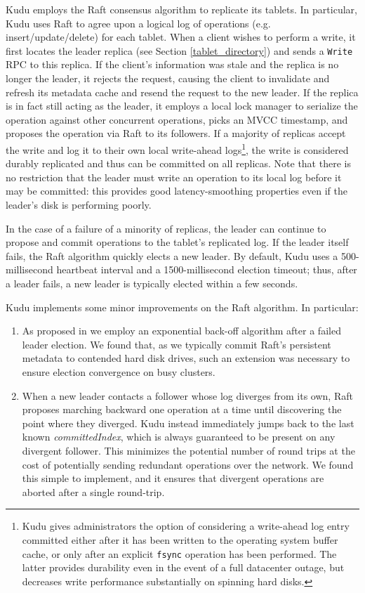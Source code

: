\documentclass[twocolumn,9pt]{article}
\begin{document}
Kudu employs the Raft\cite{raft} consensus algorithm to replicate its tablets.
In particular, Kudu uses Raft to agree upon a logical log of operations (e.g. insert/update/delete)
for each tablet. When a client wishes to perform a write, it first locates the leader replica (see
Section \ref{tablet_directory}) and sends a {\tt Write} RPC to this replica. If the client's information
was stale and the replica is no longer the leader, it rejects the request, causing the client
to invalidate and refresh its metadata cache and resend the request to the new leader. If
the replica is in fact still acting as the leader, it employs a local lock manager to serialize
the operation against other concurrent operations, picks an MVCC timestamp, and proposes
the operation via Raft to its followers. If a majority of replicas accept the write and log
it to their own local write-ahead logs\footnote{Kudu gives administrators the option of considering
a write-ahead log entry committed either after it has been written to the operating system buffer
cache, or only after an explicit {\tt fsync} operation has been performed. The latter provides
durability even in the event of a full datacenter outage, but decreases write performance
substantially on spinning hard disks.}, the write is considered
durably replicated and thus can be committed on all replicas. Note that there is no restriction
that the leader must write an operation to its local log before it may be committed:
this provides good latency-smoothing properties even if the leader's disk is performing poorly.

In the case of a failure of a minority of replicas, the leader can continue to propose
and commit operations to the tablet's replicated log. If the leader itself fails,
the Raft algorithm quickly elects a new leader. By default, Kudu uses a 500-millisecond heartbeat
interval and a 1500-millisecond election timeout; thus, after a leader fails, a new leader is
typically elected within a few seconds.

Kudu implements some minor improvements on the Raft algorithm. In particular:
\begin{enumerate}
\item As proposed in \cite{raft_refloated} we employ an exponential back-off algorithm
  after a failed leader election. We found that, as we typically commit Raft's
  persistent metadata to contended hard disk drives, such an extension was
  necessary to ensure election convergence on busy clusters.
\item When a new leader contacts a follower whose log diverges from its own,
  Raft proposes marching backward one operation at a time until discovering
  the point where they diverged. Kudu instead immediately jumps back to
  the last known {\em committedIndex}, which is always guaranteed to be
  present on any divergent follower. This minimizes the potential number
  of round trips at the cost of potentially sending redundant operations
  over the network. We found this simple to implement, and it ensures that
  divergent operations are aborted after a single round-trip.
\end{enumerate}
\end{document}
